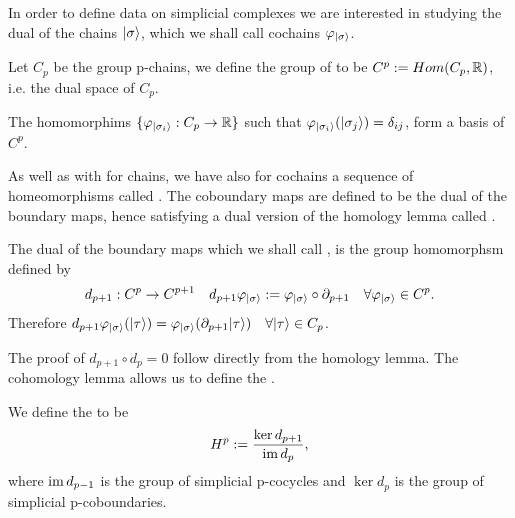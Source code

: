 \documentclass[../1.tex]{subfiles}
\begin{document}
    In order to define data on simplicial complexes we are interested in studying the dual of the chains $| \sigma \rangle$,
    which we shall call cochains $\varphi_{| \sigma \rangle}$.
       
    \begin{defn}
        Let $C_p$ be the group p-chains, we define the group of  to 
        be $C^p := Hom(C_p, \mathbb{R})$, i.e. the dual space of $C_p$.
    \end{defn}

    \begin{prop}
        The homomorphims $\{\varphi_{| \sigma_i \rangle}:C_p \to \mathbb{R}\}$ such that $\varphi_{| \sigma_i \rangle}(| \sigma_j \rangle) = \delta_{ij}$,
        form a basis of $C^p$.
    \end{prop}

    As well as with for chains, we have also for cochains a sequence of homeomorphisms called . The coboundary maps are defined
    to be the dual of the boundary maps, hence satisfying a dual version of the homology lemma called .

    \begin{defn}
        The dual of the boundary maps which we shall call
        , is the group homomorphsm defined by
        \[ d_{p+1} : C^p \to C^{p+1} \quad d_{p+1}\varphi_{| \sigma \rangle} := \varphi_{| \sigma \rangle} \circ \partial_{p+1} \quad \forall \varphi_{| \sigma \rangle} \in C^p.\]
        Therefore $d_{p+1}\varphi_{| \sigma \rangle}(| \tau \rangle) = \varphi_{| \sigma \rangle} (\partial_{p+1}| \tau \rangle) \quad \forall | \tau \rangle \in C_p$.
    \end{defn}

    The proof of $d_{p+1} \circ d_p = 0$ follow directly from the homology lemma. The cohomology lemma allows us to define the .
    
    \begin{defn}
        We define the  to be 
        \[H^p := \frac{\ker d_{p+1}}{\mathrm{im}\, d_{p}},\] 
        where $\mathrm{im}\, d_{p-1}$ is the group of simplicial p-cocycles and
        $\ker d_p$ is the group of simplicial p-coboundaries.
    \end{defn}

\end{document}
